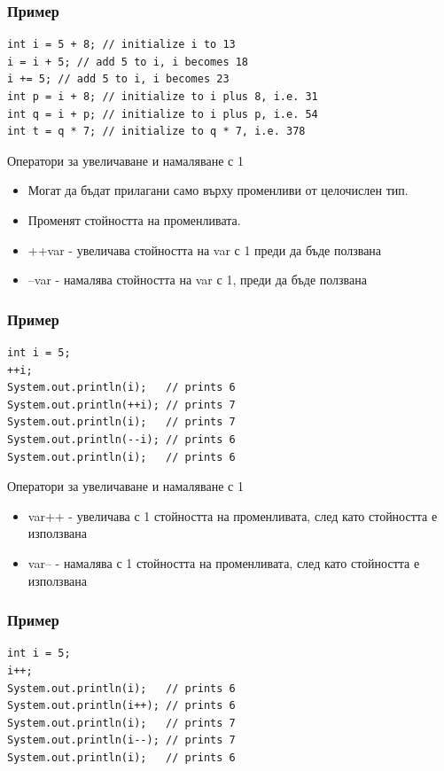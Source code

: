 \documentclass{beamer}
\begin{document}
\begin{frame}[fragile]
  \frametitle{Пример}
  \transdissolve
\begin{lstlisting}
int i = 5 + 8; // initialize i to 13
i = i + 5; // add 5 to i, i becomes 18
i += 5; // add 5 to i, i becomes 23
int p = i + 8; // initialize to i plus 8, i.e. 31
int q = i + p; // initialize to i plus p, i.e. 54
int t = q * 7; // initialize to q * 7, i.e. 378
\end{lstlisting}
\end{frame}

\begin{frame}{Оператори за увеличаване и намаляване с 1}
  \transdissolve
  \begin{itemize}
  \item Могат да бъдат прилагани само върху
    променливи от целочислен тип. \pause
   \item Променят стойността на променливата. \pause
   \item ++var - увеличава стойността на var с 1
    преди да бъде ползвана \pause
   \item --var - намалява стойността на var с 1,
    преди да бъде ползвана \pause
  \end{itemize}
\end{frame}

\begin{frame}[fragile]
  \frametitle{Пример}
  \transdissolve
\begin{lstlisting}
int i = 5;
++i;
System.out.println(i);   // prints 6
System.out.println(++i); // prints 7
System.out.println(i);   // prints 7
System.out.println(--i); // prints 6
System.out.println(i);   // prints 6
\end{lstlisting}
\end{frame}

\begin{frame}{Оператори за увеличаване и намаляване с 1}
  \transdissolve
  \begin{itemize}
  \item var++ - увеличава с 1 стойността на
    променливата, след като стойността е
    използвана \pause
  \item var-- - намалява с 1 стойността на
    променливата, след като стойността е
    използвана \pause
  \end{itemize}
\end{frame}

\begin{frame}[fragile]
  \frametitle{Пример}
  \transdissolve
\begin{lstlisting}
int i = 5;
i++;
System.out.println(i);   // prints 6
System.out.println(i++); // prints 6
System.out.println(i);   // prints 7
System.out.println(i--); // prints 7
System.out.println(i);   // prints 6
\end{lstlisting}
\end{frame}
\end{document}
